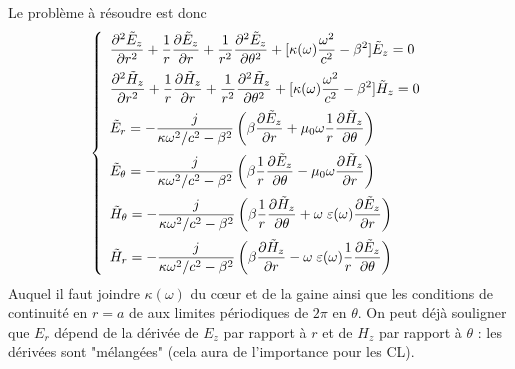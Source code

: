 Le problème à résoudre est donc
\begin{equation}
\left\{\begin{array}{l}
\DS \frac{{{\partial ^2}{{\tilde E}_z}}}{{\partial {r^2}}} + \frac{1}{r}\frac{{\partial {{\tilde E}_z}}}{{\partial r}} + \frac{1}{{{r^2}}}\frac{{{\partial ^2}{{\tilde E}_z}}}{{\partial {\theta ^2}}} + [\kappa (\omega )\frac{{{\omega ^2}}}{{{c^2}}} - {\beta ^2}]{\tilde E_z} = 0\vspace{2mm}\\
\DS\frac{{{\partial ^2}{{\tilde H}_z}}}{{\partial {r^2}}} + \frac{1}{r}\frac{{\partial {{\tilde H}_z}}}{{\partial r}} + \frac{1}{{{r^2}}}\frac{{{\partial ^2}{{\tilde H}_z}}}{{\partial {\theta ^2}}} + [\kappa (\omega )\frac{{{\omega ^2}}}{{{c^2}}} - {\beta ^2}]{\tilde H_z} = 0\DS\vspace{2mm}\\
\DS{\tilde E_r} =  - \frac{j}{{\kappa {\omega ^2}/{c^2} - {\beta ^2}}}\left( {\beta \frac{{\partial {{\tilde E}_z}}}{{\partial r}} + {\mu _0}\omega \frac{1}{r}\frac{{\partial {{\tilde H}_z}}}{{\partial \theta }}} \right)\DS\vspace{2mm}\\
\DS{\tilde E_\theta } =  - \frac{j}{{\kappa {\omega ^2}/{c^2} - {\beta ^2}}}\left( {\beta \frac{1}{r}\frac{{\partial {{\tilde E}_z}}}{{\partial \theta }} - {\mu _0}\omega \frac{{\partial {{\tilde H}_z}}}{{\partial r}}} \right)\DS\vspace{2mm}\\
\DS{\tilde H_\theta } =  - \frac{j}{{\kappa {\omega ^2}/{c^2} - {\beta ^2}}}\left( {\beta \frac{1}{r}\frac{{\partial {{\tilde H}_z}}}{{\partial \theta }} + \omega \;\varepsilon (\omega )\frac{{\partial {{\tilde E}_z}}}{{\partial r}}} \right)\DS\vspace{2mm}\\
\DS{\tilde H_r} =  - \frac{j}{{\kappa {\omega ^2}/{c^2} - {\beta ^2}}}\left( {\beta \frac{{\partial {{\tilde H}_z}}}{{\partial r}} - \omega \;\varepsilon (\omega )\frac{1}{r}\frac{{\partial {{\tilde E}_z}}}{{\partial \theta }}} \right)\DS
\end{array}\right.
\end{equation}
Auquel il faut joindre $\kappa(\omega)$ du cœur et de la gaine ainsi que les conditions de continuité
en $r=a$ de aux limites périodiques de $2\pi$ en $\theta$. On peut déjà souligner que $E_r$ dépend
de la dérivée de $E_z$ par rapport à $r$ et de $H_z$ par rapport à $\theta$ : les dérivées sont 
"mélangées" (cela aura de l'importance pour les CL).\\

